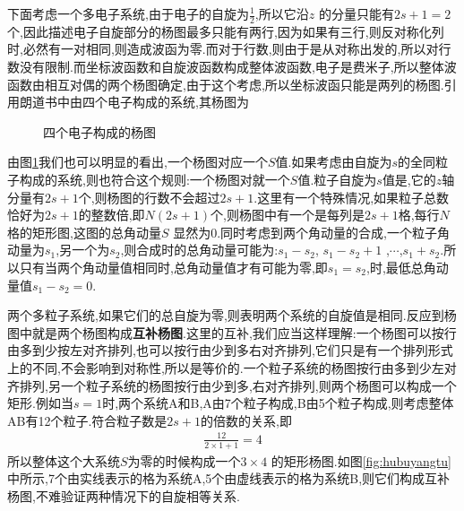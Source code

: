 下面考虑一个多电子系统,由于电子的自旋为$\frac{1}{2}$,所以它沿$z$ 的分量只能有$2s+1=2$个,因此描述电子自旋部分的杨图最多只能有两行,因为如果有三行,则反对称化列时,必然有一对相同,则造成波函为零.而对于行数,则由于是从对称出发的,所以对行数没有限制.而坐标波函数和自旋波函数构成整体波函数,电子是费米子,所以整体波函数由相互对偶的两个杨图确定,由于这个考虑,所以坐标波函只能是两列的杨图.引用朗道书中由四个电子构成的系统,其杨图为
\begin{figure}[H]
  \centering
  \caption{四个电子构成的杨图}
  \label{fig:4dianzi0}
\end{figure}

由图\ref{fig:4dianzi0}我们也可以明显的看出,一个杨图对应一个$S$值.如果考虑由自旋为$s$的全同粒子构成的系统,则也符合这个规则:一个杨图对就一个$S$值.粒子自旋为$s$值是,它的$z$轴分量有$2s+1$个,则杨图的行数不会超过$2s+1$.这里有一个特殊情况,如果粒子总数恰好为$2s+1$的整数倍,即$N(2s+1)$个,则杨图中有一个是每列是$2s+1$格,每行$N$格的矩形图,这图的总角动量$S$ 显然为0.同时考虑到两个角动量的合成,一个粒子角动量为$s_1$,另一个为$s_2$,则合成时的总角动量可能为:$s_1-s_2$, $s_1-s_2+1$ ,$\cdots$,$s_1+s_2$.所以只有当两个角动量值相同时,总角动量值才有可能为零,即$s_1=s_2$,时,最低总角动量值$s_1-s_2=0$.

两个多粒子系统,如果它们的总自旋为零,则表明两个系统的自旋值是相同.反应到杨图中就是两个杨图构成{\bf 互补杨图}.这里的互补,我们应当这样理解:一个杨图可以按行由多到少按左对齐排列,也可以按行由少到多右对齐排列,它们只是有一个排列形式上的不同,不会影响到对称性,所以是等价的.一个粒子系统的杨图按行由多到少左对齐排列,另一个粒子系统的杨图按行由少到多,右对齐排列,则两个杨图可以构成一个矩形.例如当$s=1$时,两个系统A和B,A由7个粒子构成,B由5个粒子构成,则考虑整体AB有12个粒子.符合粒子数是$2s+1$的倍数的关系,即
\begin{gather}
  \frac{12}{2\times 1+1}=4
\end{gather}
所以整体这个大系统$S$为零的时候构成一个$3\times4$ 的矩形杨图.如图\ref{fig:hubuyangtu}中所示,7个由实线表示的格为系统A,5个由虚线表示的格为系统B,则它们构成互补杨图,不难验证两种情况下的自旋相等关系.

